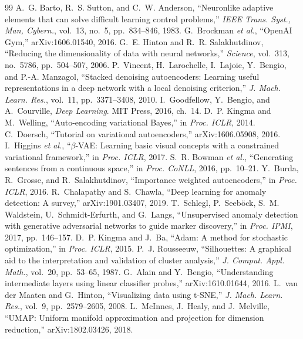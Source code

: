 \documentclass[conference]{IEEEtran}
\begin{document}
\begin{thebibliography}{99}
 A.~G. Barto, R.~S. Sutton, and C.~W. Anderson, ``Neuronlike adaptive elements that can solve difficult learning control problems,'' \emph{IEEE Trans. Syst., Man, Cybern.}, vol.~13, no.~5, pp.~834--846, 1983.
 G.~Brockman \emph{et al.}, ``OpenAI Gym,'' arXiv:1606.01540, 2016.
 G.~E. Hinton and R.~R. Salakhutdinov, ``Reducing the dimensionality of data with neural networks,'' \emph{Science}, vol.~313, no.~5786, pp.~504--507, 2006.
 P.~Vincent, H.~Larochelle, I.~Lajoie, Y.~Bengio, and P.-A. Manzagol, ``Stacked denoising autoencoders: Learning useful representations in a deep network with a local denoising criterion,'' \emph{J. Mach. Learn. Res.}, vol.~11, pp.~3371--3408, 2010.
 I.~Goodfellow, Y.~Bengio, and A.~Courville, \emph{Deep Learning}. MIT Press, 2016, ch.~14.
 D.~P. Kingma and M.~Welling, ``Auto-encoding variational Bayes,'' in \emph{Proc. ICLR}, 2014.
 C.~Doersch, ``Tutorial on variational autoencoders,'' arXiv:1606.05908, 2016.
 I.~Higgins \emph{et al.}, ``$\beta$-VAE: Learning basic visual concepts with a constrained variational framework,'' in \emph{Proc. ICLR}, 2017.
 S.~R. Bowman \emph{et al.}, ``Generating sentences from a continuous space,'' in \emph{Proc. CoNLL}, 2016, pp.~10--21.
 Y.~Burda, R.~Grosse, and R.~Salakhutdinov, ``Importance weighted autoencoders,'' in \emph{Proc. ICLR}, 2016.
 R.~Chalapathy and S.~Chawla, ``Deep learning for anomaly detection: A survey,'' arXiv:1901.03407, 2019.
 T.~Schlegl, P.~Seeb\"ock, S.~M. Waldstein, U.~Schmidt-Erfurth, and G.~Langs, ``Unsupervised anomaly detection with generative adversarial networks to guide marker discovery,'' in \emph{Proc. IPMI}, 2017, pp.~146--157.
 D.~P. Kingma and J.~Ba, ``Adam: A method for stochastic optimization,'' in \emph{Proc. ICLR}, 2015.
 P.~J. Rousseeuw, ``Silhouettes: A graphical aid to the interpretation and validation of cluster analysis,'' \emph{J. Comput. Appl. Math.}, vol.~20, pp.~53--65, 1987.
 G.~Alain and Y.~Bengio, ``Understanding intermediate layers using linear classifier probes,'' arXiv:1610.01644, 2016.
 L.~van der Maaten and G.~Hinton, ``Visualizing data using t-SNE,'' \emph{J. Mach. Learn. Res.}, vol.~9, pp.~2579--2605, 2008.
 L.~McInnes, J.~Healy, and J.~Melville, ``UMAP: Uniform manifold approximation and projection for dimension reduction,'' arXiv:1802.03426, 2018.
\end{thebibliography}
\end{document}
